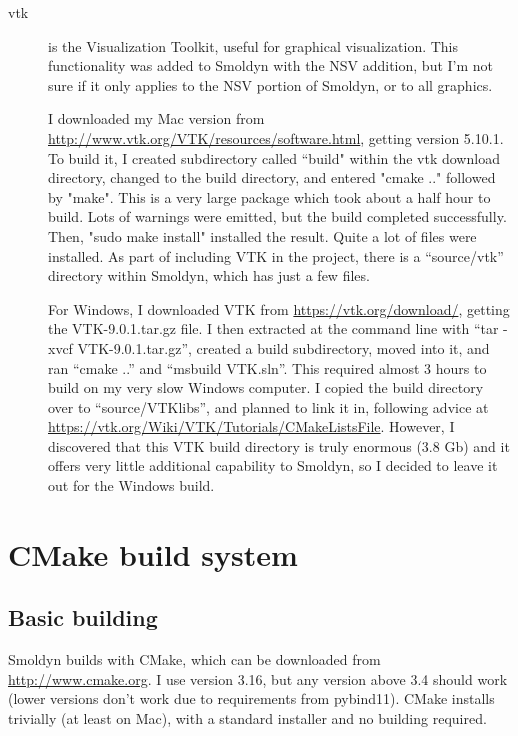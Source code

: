 \documentclass {scrbook}
\begin{document}
\begin{description}
\item[vtk] is the Visualization Toolkit, useful for graphical visualization. This functionality was added to Smoldyn with the NSV addition, but I'm not sure if it only applies to the NSV portion of Smoldyn, or to all graphics.

I downloaded my Mac version from \url{http://www.vtk.org/VTK/resources/software.html}, getting version 5.10.1. To build it, I created subdirectory called ``build" within the vtk download directory, changed to the build directory, and entered "cmake .." followed by "make". This is a very large package which took about a half hour to build. Lots of warnings were emitted, but the build completed successfully. Then, "sudo make install" installed the result. Quite a lot of files were installed. As part of including VTK in the project, there is a ``source/vtk'' directory within Smoldyn, which has just a few files.

For Windows, I downloaded VTK from \url{https://vtk.org/download/}, getting the VTK-9.0.1.tar.gz file. I then extracted at the command line with ``tar -xvcf VTK-9.0.1.tar.gz'', created a build subdirectory, moved into it, and ran ``cmake ..'' and ``msbuild VTK.sln''. This required almost 3 hours to build on my very slow Windows computer. I copied the build directory over to ``source/VTKlibs'', and planned to link it in, following advice at \url{https://vtk.org/Wiki/VTK/Tutorials/CMakeListsFile}. However, I discovered that this VTK build directory is truly enormous (3.8 Gb) and it offers very little additional capability to Smoldyn, so I decided to leave it out for the Windows build.

\end{description}

\section{CMake build system}

\subsection{Basic building}
Smoldyn builds with CMake, which can be downloaded from \url{http://www.cmake.org}. I use version 3.16, but any version above 3.4 should work (lower versions don't work due to requirements from pybind11). CMake installs trivially (at least on Mac), with a standard installer and no building required.
\end{document}
